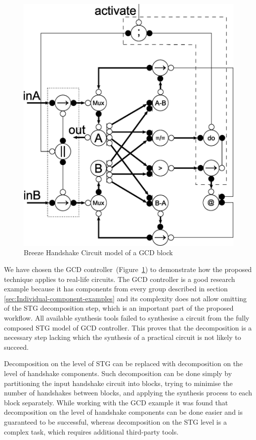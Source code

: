 \begin{figure}[!t]
\centering
\includegraphics[width=0.3\paperwidth]{figures/breeze-gcd-partition}

\caption{Breeze Handshake Circuit model of a GCD block\label{fig:GCD}}
\end{figure}


We have chosen the GCD controller~(Figure~\ref{fig:GCD}) to demonstrate
how the proposed technique applies to real-life circuits. The GCD
controller is a good research example because it has components from
every group described in section \ref{sec:Individual-component-examples}
and its complexity does not allow omitting of the STG decomposition
step, which is an important part of the proposed workflow. All available
synthesis tools failed to synthesise a circuit from the fully composed
STG model of GCD controller. This proves that the decomposition is
a necessary step lacking which the synthesis of a practical circuit
is not likely to succeed.

Decomposition on the level of STG can be replaced with decomposition
on the level of handshake components. Such decomposition can be done
simply by partitioning the input handshake circuit into blocks, trying
to minimise the number of handshakes between blocks, and applying
the synthesis process to each block separately. While working with
the GCD example it was found that decomposition on the level of handshake
components can be done easier and is guaranteed to be successful,
whereas decomposition on the STG level is a complex task, which requires
additional third-party tools.


